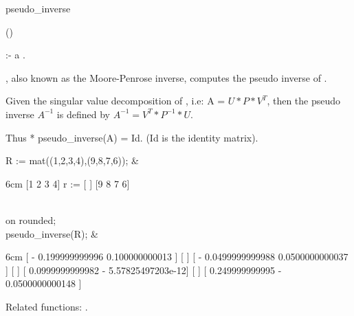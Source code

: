 \begin{Operator}{pseudo_inverse}

\begin{Syntax}
()
\end{Syntax}

 :- a .

, also known as the Moore-Penrose inverse, 
computes the pseudo inverse of . 

Given the singular value decomposition of , i.e: 
A = $U*P*V^T$, then the pseudo inverse $A^{-1}$ is defined by
$A^{-1} = V^T*P^{-1}*U$.

Thus  *  pseudo\_inverse(A) = Id.
(Id is the identity matrix).


\begin{Examples}

R := mat((1,2,3,4),(9,8,7,6)); &
\begin{multilineoutput}{6cm}
     [1  2  3  4]
r := [          ]
     [9  8  7  6]
\end{multilineoutput}\\

on rounded; \\
pseudo_inverse(R); &
\begin{multilineoutput}{6cm}
[ - 0.199999999996      0.100000000013   ]
[                                        ]
[ - 0.0499999999988    0.0500000000037   ]
[                                        ]
[ 0.0999999999982     - 5.57825497203e-12]
[                                        ]
[  0.249999999995      - 0.0500000000148 ]
\end{multilineoutput}

\end{Examples}


Related functions: .

\end{Operator}


